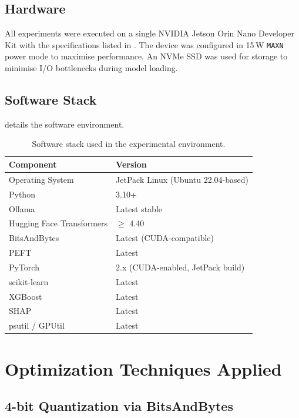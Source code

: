 \documentclass[12pt,a4paper,oneside]{report}
\begin{document}
\subsection{Hardware}

All experiments were executed on a single NVIDIA Jetson Orin Nano Developer Kit with the specifications listed in . The device was configured in 15\,W \texttt{MAXN} power mode to maximise performance. An NVMe SSD was used for storage to minimise I/O bottlenecks during model loading.

\subsection{Software Stack}

 details the software environment.

\begin{table}[htbp]
\caption{Software stack used in the experimental environment.}
\label{tab:software-stack}
\centering
\begin{tabular}{ll}
\toprule
\textbf{Component} & \textbf{Version} \\
\midrule
Operating System       & JetPack Linux (Ubuntu 22.04-based) \\
Python                 & 3.10+ \\
Ollama                 & Latest stable \\
Hugging Face Transformers & $\geq$ 4.40 \\
BitsAndBytes           & Latest (CUDA-compatible) \\
PEFT                   & Latest \\
PyTorch                & 2.x (CUDA-enabled, JetPack build) \\
scikit-learn           & Latest \\
XGBoost                & Latest \\
SHAP                   & Latest \\
psutil / GPUtil        & Latest \\
\bottomrule
\end{tabular}
\end{table}


\section{Optimization Techniques Applied}
\label{sec:meth-optimization}

\subsection{4-bit Quantization via BitsAndBytes}
\end{document}
